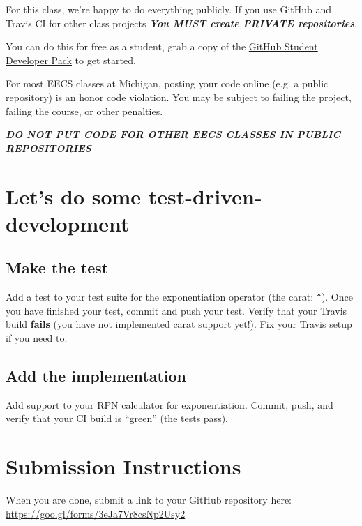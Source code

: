 \documentclass{article}
\begin{document}
\begin{mdframed}\centering
For this class, we're happy to do everything publicly. If you use GitHub and
Travis CI for other class projects
\textbf{\emph{\large You MUST create PRIVATE repositories}}.

You can do this for free as a student, grab a copy of the
\href{https://education.github.com/pack}{GitHub Student Developer Pack} to get
started.

{\color{red}
  For most EECS classes at Michigan, posting your code online (e.g. a public
  repository) is an honor code violation. You may be subject to failing the
  project, failing the course, or other penalties.

  \textbf{\emph{\Large DO NOT PUT CODE FOR OTHER EECS CLASSES IN PUBLIC REPOSITORIES}}
}
\end{mdframed}










\newpage

\section{Let's do some test-driven-development}

\subsection{Make the test}
Add a test to your test suite for the exponentiation operator (the carat:
\texttt{\^{}}). Once you have finished your test, commit and push your test.
Verify that your Travis build \textbf{fails} (you have not implemented carat
support yet!). Fix your Travis setup if you need to.

\subsection{Add the implementation}
Add support to your RPN calculator for exponentiation. Commit, push,
and verify that your CI build is ``green'' (the tests pass).


\section*{Submission Instructions}
When you are done, submit a link to your GitHub repository here: \url{https://goo.gl/forms/3eJa7Vr8csNp2Usy2}
\end{document}
